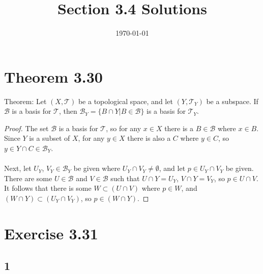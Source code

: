 \documentclass{article}
\title{\textbf{Section 3.4 Solutions}}
\date{}
\date\today+
\begin{document}
\maketitle %

\thispagestyle{firstpage}
\section*{Theorem 3.30}

Theorem: Let $(X, \mathcal{T})$ be a topological space, and let $(Y, \mathcal{T}_Y)$ be a subspace.  If $\mathcal{B}$ is a 
basis for $\mathcal{T}$, then $\mathcal{B}_Y = \{B \cap Y | B \in \mathcal{B} \}$ is a basis for $\mathcal{T}_Y$.

\begin{proof}
  The set $\mathcal{B}$ is a basis for $\mathcal{T}$, so for any $x \in X$ there is a $B \in \mathcal{B}$ where $x \in B$.  Since $Y$ is a subset of 
  $X$, for any $y \in X$ there is also a $C$ where $y \in C$, so $y \in Y \cap C \in \mathcal{B}_Y$. \\ 
  \\ 
  Next, let $U_Y$, $V_Y \in \mathcal{B}_Y$ be given where $U_Y \cap V_Y \neq \emptyset$, and let $p \in U_Y \cap V_Y$ be given.  There are some $U \in \mathcal{B}$ 
  and $V \in \mathcal{B}$ such that $U \cap Y = U_Y$, $V \cap Y = V_Y$, so $p \in U \cap V$.  It follows that there is some $W \subset (U \cap V)$ where $p \in W$, 
  and $(W \cap Y) \subset (U_Y \cap V_Y)$, so $p \in (W \cap Y)$.
\end{proof}

\section*{Exercise 3.31} 



\subsection*{1} 
\end{document}
